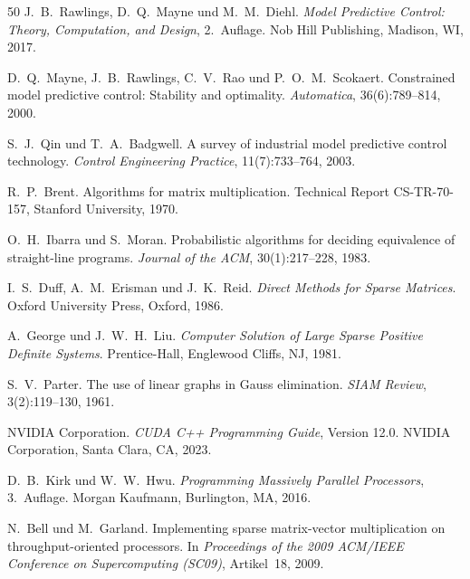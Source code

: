 \documentclass[a4paper,12pt]{report}
\theoremstyle{definition}
\begin{document}
\begin{thebibliography}{50}
J.~B.~Rawlings, D.~Q.~Mayne und M.~M.~Diehl.
\newblock \textit{Model Predictive Control: Theory, Computation, and Design}, 2.~Auflage.
\newblock Nob Hill Publishing, Madison, WI, 2017.

D.~Q.~Mayne, J.~B.~Rawlings, C.~V.~Rao und P.~O.~M.~Scokaert.
\newblock Constrained model predictive control: Stability and optimality.
\newblock \textit{Automatica}, 36(6):789--814, 2000.

S.~J.~Qin und T.~A.~Badgwell.
\newblock A survey of industrial model predictive control technology.
\newblock \textit{Control Engineering Practice}, 11(7):733--764, 2003.

R.~P.~Brent.
\newblock Algorithms for matrix multiplication.
\newblock Technical Report CS-TR-70-157, Stanford University, 1970.

O.~H.~Ibarra und S.~Moran.
\newblock Probabilistic algorithms for deciding equivalence of straight-line programs.
\newblock \textit{Journal of the ACM}, 30(1):217--228, 1983.

I.~S.~Duff, A.~M.~Erisman und J.~K.~Reid.
\newblock \textit{Direct Methods for Sparse Matrices}.
\newblock Oxford University Press, Oxford, 1986.

A.~George und J.~W.~H.~Liu.
\newblock \textit{Computer Solution of Large Sparse Positive Definite Systems}.
\newblock Prentice-Hall, Englewood Cliffs, NJ, 1981.

S.~V.~Parter.
\newblock The use of linear graphs in Gauss elimination.
\newblock \textit{SIAM Review}, 3(2):119--130, 1961.

NVIDIA Corporation.
\newblock \textit{CUDA C++ Programming Guide}, Version 12.0.
\newblock NVIDIA Corporation, Santa Clara, CA, 2023.

D.~B.~Kirk und W.~W.~Hwu.
\newblock \textit{Programming Massively Parallel Processors}, 3.~Auflage.
\newblock Morgan Kaufmann, Burlington, MA, 2016.

N.~Bell und M.~Garland.
\newblock Implementing sparse matrix-vector multiplication on throughput-oriented processors.
\newblock In \textit{Proceedings of the 2009 ACM/IEEE Conference on Supercomputing (SC09)}, Artikel~18, 2009.


\end{thebibliography}
\end{document}
